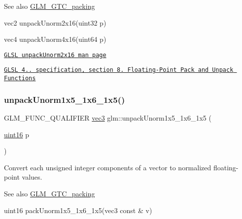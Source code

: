 \begin{DoxySeeAlso}{See also}
\hyperlink{group__gtc__packing}{G\+L\+M\+\_\+\+G\+T\+C\+\_\+packing} 

vec2 unpack\+Unorm2x16(uint32 p) 

vec4 unpack\+Unorm4x16(uint64 p) 

\href{http://www.opengl.org/sdk/docs/manglsl/xhtml/unpackUnorm2x16.xml}{\tt G\+L\+SL unpack\+Unorm2x16 man page} 

\href{http://www.opengl.org/registry/doc/GLSLangSpec.4.20.8.pdf}{\tt G\+L\+SL 4.. specification, section 8. Floating-\/\+Point Pack and Unpack Functions} 
\end{DoxySeeAlso}
\mbox{\label{group__gtc__packing_ga6804d0525daf68bcac226f46fbb3b24e}} 
\subsubsection{\texorpdfstring{unpack\+Unorm1x5\+\_\+1x6\+\_\+1x5()}{unpackUnorm1x5\_1x6\_1x5()}}
{\footnotesize\ttfamily G\+L\+M\+\_\+\+F\+U\+N\+C\+\_\+\+Q\+U\+A\+L\+I\+F\+I\+ER \hyperlink{group__core__types_ga1c47e8b3386109bc992b6c48e91b0be7}{vec3} glm\+::unpack\+Unorm1x5\+\_\+1x6\+\_\+1x5 (\begin{DoxyParamCaption}\item[{\hyperlink{group__gtc__type__precision_gad8c2939e1fdd8e5828b31d95c52255d5}{uint16}}]{p }\end{DoxyParamCaption})}

Convert each unsigned integer components of a vector to normalized floating-\/point values.

\begin{DoxySeeAlso}{See also}
\hyperlink{group__gtc__packing}{G\+L\+M\+\_\+\+G\+T\+C\+\_\+packing} 

uint16 pack\+Unorm1x5\+\_\+1x6\+\_\+1x5(vec3 const \& v) 
\end{DoxySeeAlso}
\mbox{\label{group__gtc__packing_ga32f3f2642df2ea87449d59fb614a8305}} 
